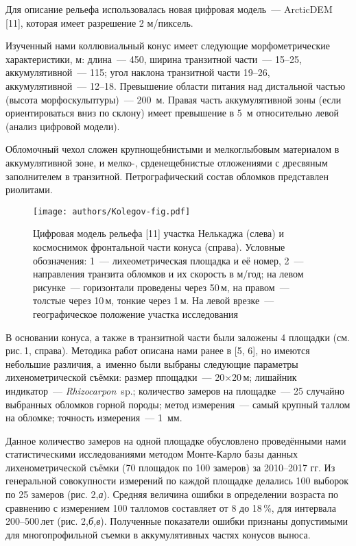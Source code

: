 Для описание рельефа использовалась новая цифровая модель~--- ArcticDEM [11], которая имеет разрешение 2 м/пиксель.

Изученный нами коллювиальный конус имеет следующие морфометрические характеристики, м: длина~---  450, ширина транзитной части~---  15--25, аккумулятивной~--- 115; угол наклона транзитной части 19--26\dg, аккумулятивной~--- 12--18\dg. Превышение области питания над дистальной частью (высота морфоскульптуры)~--- 200~м. Правая часть аккумулятивной зоны (если ориентироваться вниз по склону) имеет превышение в 5~м относительно левой (анализ цифровой модели).

Обломочный чехол сложен крупнощебнистыми и мелкоглыбовым материалом в аккумулятивной зоне, и мелко-, срденещебнистые отложениями с дресвяным заполнителем в транзитной. Петрографический состав обломков представлен риолитами.

\begin{figure}[H]
  \centering
  \texttt{[image: authors/Kolegov-fig.pdf]}
  \caption{Цифровая модель рельефа [11] участка Нелькаджа (слева) и космоснимок фронтальной части конуса (справа). Условные обозначения: 1~--- лихеометрическая площадка и её номер, 2~--- направления транзита обломков и их скорость в м/год; на левом рисунке~--- горизонтали проведены через 50\,м, на правом~--- толстые через 10\,м, тонкие через 1\,м. На левой врезке~--- географическое положение участка исследования}
  \label{fig:kolegov-fig}
\end{figure}

В основании конуса, а также в транзитной части были заложены 4 площадки (см. рис.\,1, справа). Методика работ описана нами ранее в [5, 6], но имеются небольшие различия, а~именно были выбраны следующие параметры лихенометрической съёмки:  размер ппощадки~--- 20$\times$20\,м; лишайник индикатор~--- \textit{Rhizocarpon}~sp.; количество замеров на площадке~--- 25 случайно выбранных обломков горной породы; метод измерения~--- самый крупный таллом на обломке; точность измерения~--- 1~мм.

Данное количество замеров на одной площадке обусловлено проведёнными нами статистическими исследованиями методом Монте-Карло базы данных лихенометрической съёмки (70 площадок по 100 замеров) за 2010--2017 гг. Из генеральной совокупности измерений по каждой площадке делались 100 выборок по 25 замеров (рис. 2,\textit{а}). Средняя величина ошибки в определении возраста по сравнению с измерением 100 талломов составляет от 8 до 18\,\%, для интервала 200--500\,лет (рис. 2,\textit{б,в}).  Полученные показатели ошибки признаны допустимыми для многопрофильной съемки в аккумулятивных частях конусов выноса.



